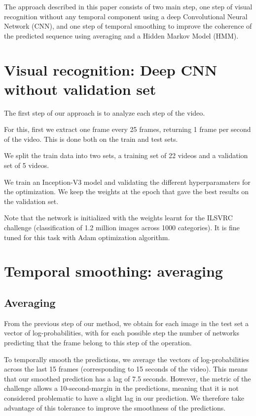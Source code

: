 \documentclass[runningheads,a4paper]{llncs}
\begin{document}
The approach described in this paper consists of two main step, one step of visual
recognition without any temporal component using a deep Convolutional Neural
Network (CNN), and one step of temporal smoothing to improve the coherence of the
predicted sequence using averaging and a Hidden Markov Model (HMM).

\section{Visual recognition: Deep CNN without validation set}

The first step of our approach is to analyze each step of the video.

For this, first we extract one frame every 25 frames, returning 1 frame per second
of the video. This is done both on the train and test sets.

We split the train data into two sets, a training set of 22 videos and a validation
set of 5 videos.

We train an Inception-V3 \cite{szegedy2015rethinking} model and validating the
different hyperparamaters for the optimization. We
keep the weights at the epoch that gave the best results on the validation set.

Note that the network is initialized with the weights learnt for the ILSVRC challenge
(classification of 1.2 million images across 1000 categories). It is fine tuned
for this task with Adam \cite{Kingma14} optimization algorithm.

\section{Temporal smoothing: averaging}

\subsection{Averaging}

From the previous step of our method, we obtain for each image in the test set
a vector of log-probabilities, with for each possible step the number of networks predicting
that the frame belong to this step of the operation.

To temporally smooth the predictions, we average the vectors of log-probabilities across the
last 15 frames (corresponding to 15 seconds of the video). This means that our
smoothed prediction has a lag of 7.5 seconds. However, the metric of the challenge
allows a 10-second-margin in the predictions, meaning that it is not considered
problematic to have a slight lag in our prediction. We therefore take advantage
of this tolerance to improve the smoothness of the predictions.
\end{document}
